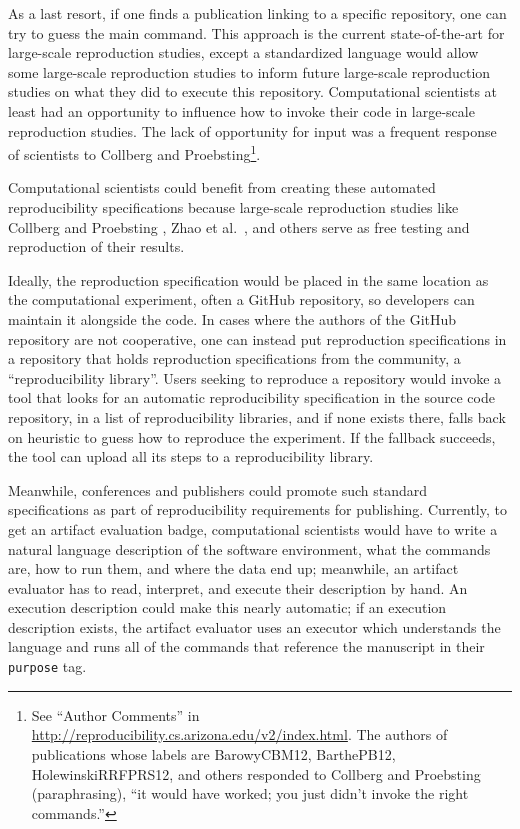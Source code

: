 \documentclass[manuscript,authordraft]{acmart}
\begin{document}
As a last resort, if one finds a publication linking to a specific
repository, one can try to guess the main command. This approach is the
current state-of-the-art for large-scale reproduction studies, except a
standardized language would allow some large-scale reproduction studies
to inform future large-scale reproduction studies on what they did to
execute this repository. Computational scientists at least had an
opportunity to influence how to invoke their code in large-scale
reproduction studies. The lack of opportunity for input was a frequent
response of scientists to Collberg and Proebsting\footnote{See ``Author
  Comments'' in
  \url{http://reproducibility.cs.arizona.edu/v2/index.html}. The authors
  of publications whose labels are BarowyCBM12, BarthePB12,
  HolewinskiRRFPRS12, and others responded to Collberg and Proebsting
  (paraphrasing), ``it would have worked; you just didn't invoke the
  right commands.''}.

Computational scientists could benefit from creating these automated
reproducibility specifications because large-scale reproduction studies
like Collberg and Proebsting \cite{collberg_repeatability_2016}, Zhao et
al.~\cite{zhao_why_2012}, and others serve as free testing and
reproduction of their results.

Ideally, the reproduction specification would be placed in the same
location as the computational experiment, often a GitHub repository, so
developers can maintain it alongside the code. In cases where the
authors of the GitHub repository are not cooperative, one can instead
put reproduction specifications in a repository that holds reproduction
specifications from the community, a ``reproducibility library''. Users
seeking to reproduce a repository would invoke a tool that looks for an
automatic reproducibility specification in the source code repository,
in a list of reproducibility libraries, and if none exists there, falls
back on heuristic to guess how to reproduce the experiment. If the
fallback succeeds, the tool can upload all its steps to a
reproducibility library.

Meanwhile, conferences and publishers could promote such standard
specifications as part of reproducibility requirements for publishing.
Currently, to get an artifact evaluation badge, computational scientists
would have to write a natural language description of the software
environment, what the commands are, how to run them, and where the data
end up; meanwhile, an artifact evaluator has to read, interpret, and
execute their description by hand. An execution description could make
this nearly automatic; if an execution description exists, the artifact
evaluator uses an executor which understands the language and runs all
of the commands that reference the manuscript in their \texttt{purpose}
tag.
\end{document}
